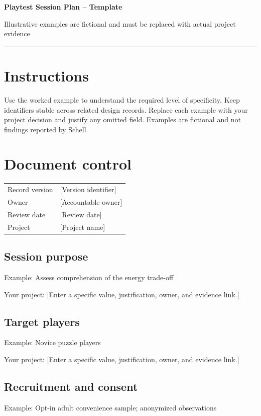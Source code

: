 \documentclass[11pt]{article}
\begin{document}
{\huge\bfseries\color{suiteblue} Playtest Session Plan -- Template}\par
\vspace{0.15in}
{\normalsize\color{suitegray} Illustrative examples are fictional and must be replaced with actual project evidence}\par
\vspace{0.15in}\hrule\vspace{0.15in}

\section{Instructions}
Use the worked example to understand the required level of specificity. Keep identifiers stable across related design records. Replace each example with your project decision and justify any omitted field. Examples are fictional and not findings reported by Schell.


\section{Document control}
\begin{tabularx}{\linewidth}{@{}lX@{}}\toprule Record version & [Version identifier]\\ Owner & [Accountable owner]\\ Review date & [Review date]\\ Project & [Project name]\\\bottomrule\end{tabularx}

\subsection{Session purpose}
Example: Assess comprehension of the energy trade-off

Your project: [Enter a specific value, justification, owner, and evidence link.]


\subsection{Target players}
Example: Novice puzzle players

Your project: [Enter a specific value, justification, owner, and evidence link.]


\subsection{Recruitment and consent}
Example: Opt-in adult convenience sample; anonymized observations
\end{document}
